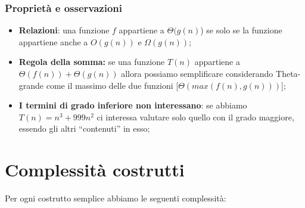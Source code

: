\subsubsection{Proprietà e
osservazioni}\label{proprietuxe0-e-osservazioni}

\begin{itemize}
\item
  \textbf{Relazioni}: una funzione \(f\) appartiene a \(\Theta(g(n)\))
  se solo se la funzione appartiene anche a \(O(g(n))\) e
  \(\Omega(g(n))\);
\item
  \textbf{Regola della somma:} se una funzione \(T(n)\) appartiene a
  \(\Theta(f(n)) + \Theta(g(n))\) allora possiamo semplificare
  considerando Theta-grande come il massimo delle due funzioni
  {[}\(\Theta(max(f(n),g(n)))\){]};
\item
  \textbf{I termini di grado inferiore non interessano}: se abbiamo
  \(T(n) = n^{3} + 999n^{2}\) ci interessa valutare solo quello con il
  grado maggiore, essendo gli altri ``contenuti'' in esso;
\end{itemize}

\section{Complessità costrutti}\label{complessituxe0-costrutti}

Per ogni costrutto semplice abbiamo le seguenti complessità:

